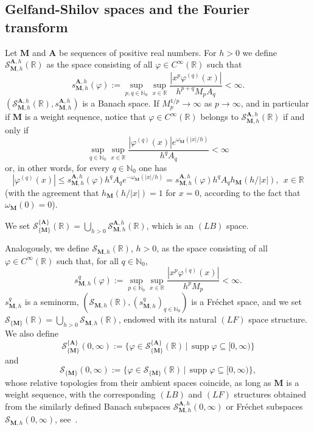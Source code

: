 \documentclass[12pt,a4paper]{article}
\newcommand{\N}{\mathbb{N}}
\newcommand{\R}{\mathbb{R}}
\newcommand{\SMA}{\mathcal{S}^{\{\A\}}_{\{\M\}}}
\newcommand{\M}{{\boldsymbol{M}}}
\newcommand{\A}{{\boldsymbol{A}}}
\newcommand{\supp}{\operatorname{supp}}
\newcommand{\om}{\omega}
\theoremstyle{plain}
\theoremstyle{definition}
\numberwithin{equation}{section}
\begin{document}
\subsection{Gelfand-Shilov spaces and the Fourier transform}\label{GSspaceswithdm}
Let $\M$ and $\A$ be sequences of positive real numbers. For $h>0$ we define $\mathcal{S}_{\M,h}^{\A,h}(\R)$ as the space consisting of all $\varphi \in C^\infty(\R)$ such that
$$
s_{\M,h}^{\A,h}(\varphi):=\sup_{p,q \in \N_0} \sup_{x \in \R} \frac{|x^p\varphi^{(q)}(x)|}{h^{p+q}M_pA_q} < \infty.
$$
$(\mathcal{S}_{\M,h}^{\A,h}(\R),s_{\M,h}^{\A,h})$ is a Banach space. If $M_p^{1/p}\to\infty$ as $p\to\infty$, and in particular if $\M$ is a weight sequence, notice that $\varphi \in C^\infty(\R)$ belongs to  $\mathcal{S}_{\M,h}^{\A,h}(\R)$ if and only if
$$
\sup_{q \in \N_0} \sup_{x \in \R} \frac{|\varphi^{(q)}(x)|e^{\om_{\M}(|x|/h)}}{h^{q}A_q} < \infty
$$
or, in other words, for every $q \in \N_0$ one has
\begin{equation}\label{eq.fibelongsSMAviahM}
|\varphi^{(q)}(x)|\le s_{\M,h}^{\A,h}(\varphi) h^{q}A_qe^{-\om_{\M}(|x|/h)}= s_{\M,h}^{\A,h}(\varphi)h^{q}A_qh_{\M}(h/|x|),\ \ x\in\R
\end{equation}
(with the agreement that $h_{\M}(h/|x|)=1$ for $x=0$, according to the fact that $\om_{\M}(0)=0$).

We set $\SMA(\R) = \bigcup_{h>0} \mathcal{S}_{\M,h}^{\A,h}(\R)$, which is an $(LB)$ space.

Analogously, we define  $\mathcal{S}_{\M,h}(\R)$, $h> 0$, as the space consisting of all $\varphi \in C^\infty(\R)$ such that, for all $q\in\N_0$,
$$
s_{\M,h}^{q}(\varphi):=\sup_{p\in \N_0} \sup_{x \in \R} \frac{|x^p\varphi^{(q)}(x)|}{h^{p}M_p} < \infty.
$$
$s_{\M,h}^{q}$ is a seminorm, $(\mathcal{S}_{\M,h}(\R),(s_{\M,h}^{q})_{q\in\N_0})$ is a Fr\'echet space, and we set $\mathcal{S}_{\{\M\}}(\R) = \bigcup_{h>0} \mathcal{S}_{\M,h}(\R)$, endowed with its natural $(LF)$ space structure. We also define
$$
\SMA(0,\infty) := \{ \varphi \in \SMA(\R) \, | \, \supp \varphi \subseteq [0,\infty)\}
$$
and
$$
\mathcal{S}_{\{\M\}}(0,\infty) := \{ \varphi \in \mathcal{S}_{\{\M\}}(\R) \, | \, \supp \varphi \subseteq [0,\infty)\},
$$
whose relative topologies from their ambient spaces coincide, as long as $\M$ is a weight sequence, with the corresponding $(LB)$ and $(LF)$ structures obtained from the similarly defined Banach subspaces $\mathcal{S}_{\M,h}^{\A,h}(0,\infty)$ or Fr\'echet subspaces $\mathcal{S}_{\M,h}(0,\infty)$, see~\cite[Lemma 3.3 and page 24]{momentsdebrouwere}.
\end{document}
